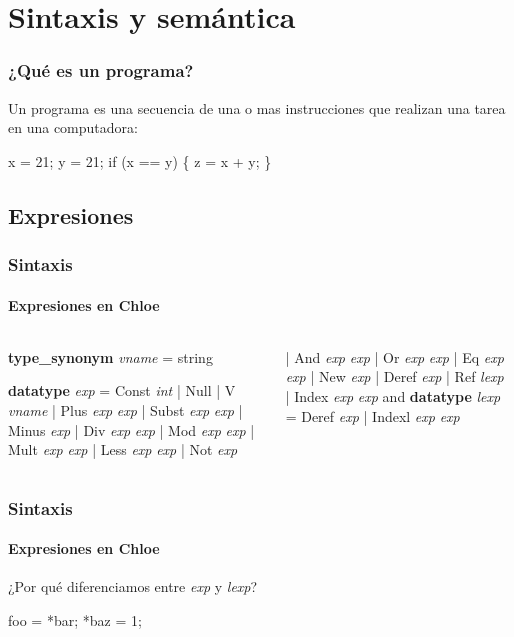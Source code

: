 \section{Sintaxis y semántica}

\begin{frame}[fragile]
\frametitle{¿Qué es un programa?}

Un programa es una secuencia de una o mas instrucciones que realizan una tarea en una computadora:

\begin{example}
\begin{semiverbatim}
x = 21;
y = 21;
if (x == y) \{
  z = x + y;
\}
\end{semiverbatim}
\end{example}


\end{frame}

\subsection{Expresiones}

\begin{frame}[fragile]
\frametitle{Sintaxis}
\framesubtitle{Expresiones en Chloe}

\begin{columns}[t]
\begin{semiverbatim}
\textbf{type_synonym} \textit{vname} = string

\textbf{datatype} \textit{exp} = Const \textit{int}
  | Null
  | V      \textit{vname}
  | Plus  \textit{exp} \textit{exp}
  | Subst \textit{exp} \textit{exp}
  | Minus \textit{exp}
  | Div   \textit{exp} \textit{exp}
  | Mod   \textit{exp} \textit{exp}
  | Mult  \textit{exp} \textit{exp}
  | Less  \textit{exp} \textit{exp}
  | Not   \textit{exp}
\end{semiverbatim}
\begin{semiverbatim}
  | And   \textit{exp} \textit{exp}
  | Or    \textit{exp} \textit{exp}
  | Eq    \textit{exp} \textit{exp}
  | New   \textit{exp}
  | Deref \textit{exp}
  | Ref   \textit{lexp}
  | Index \textit{exp} \textit{exp}
and
\textbf{datatype} \textit{lexp} = Deref \textit{exp}
  | Indexl \textit{exp} \textit{exp}
\end{semiverbatim}
\end{columns}


\end{frame}


\begin{frame}[fragile]
\frametitle{Sintaxis}
\framesubtitle{Expresiones en Chloe}

¿Por qué diferenciamos entre \textit{exp} y \textit{lexp}?
\begin{example}
\begin{semiverbatim}
foo = *bar;
*baz = 1;
\end{semiverbatim}
\end{example}



\end{frame}



